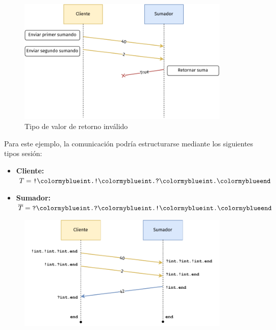 \begin{frame}{\insertsubsection}
	\begin{figure}
		\centering
		\includegraphics[width=0.9\textwidth]{images/sum-diagram-type-violation.pdf}
		\caption{Tipo de valor de retorno inválido}
	\end{figure}
\end{frame}

\begin{frame}{\insertsubsection}
	Para este ejemplo, la comunicación podría estructurarse mediante los siguientes tipos sesión:
	\begin{itemize}
		\item \textbf{Cliente:} $\SessionType = \Out\tint{ \Out\tint{ \In\tint\End } }$
		\item \textbf{Sumador:} $\dual\SessionType = \In\tint{ \In\tint{ \Out\tint\End } }$
	\end{itemize}

	\begin{figure}
		\centering
		\includegraphics[width=0.9\textwidth]{images/sum-diagram-st.pdf}
	\end{figure}
\end{frame}

